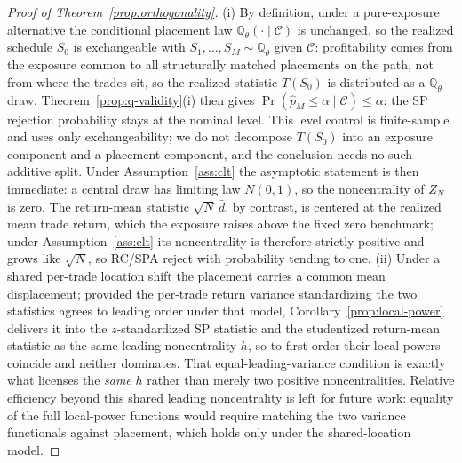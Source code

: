 \documentclass[risks,article,submit,pdftex,oneauthor]{Definitions/mdpi}
\begin{document}
\begin{proof}[Proof of Theorem~\ref{prop:orthogonality}]
(i) By definition, under a pure-exposure alternative the conditional placement law
$\mathbb{Q}_\theta(\cdot\mid\mathcal C)$ is unchanged, so the realized schedule
$S_0$ is exchangeable with $S_1,\dots,S_M\sim\mathbb{Q}_\theta$ given $\mathcal C$:
profitability comes from the exposure common to all structurally matched
placements on the path, not from where the trades sit, so the realized statistic
$T(S_0)$ is distributed as a $\mathbb{Q}_\theta$-draw.
Theorem~\ref{prop:q-validity}(i) then gives
$\Pr(\hat p_M\le\alpha\mid\mathcal C)\le\alpha$: the SP rejection probability stays
at the nominal level. This level control is finite-sample and uses only
exchangeability; we do not decompose $T(S_0)$ into an exposure component and a
placement component, and the conclusion needs no such additive split. Under
Assumption~\ref{ass:clt} the asymptotic statement is then immediate: a central draw
has limiting law $N(0,1)$, so the noncentrality of $Z_N$ is zero. The return-mean
statistic $\sqrt N\,\bar d$, by contrast, is centered at the realized mean trade
return, which the exposure raises above the fixed zero benchmark; under
Assumption~\ref{ass:clt} its noncentrality is therefore strictly positive and grows
like $\sqrt N$, so RC/SPA reject with probability tending to one. (ii) Under a
shared per-trade location shift the placement carries a common mean displacement;
provided the per-trade return variance standardizing the two statistics agrees to
leading order under that model, Corollary~\ref{prop:local-power} delivers it into
the $z$-standardized SP statistic and the studentized return-mean statistic as the
same leading noncentrality $h$, so to first order their local powers coincide and
neither dominates. That equal-leading-variance condition is exactly what licenses
the \emph{same} $h$ rather than merely two positive noncentralities. Relative
efficiency beyond this shared leading noncentrality is left for future work:
equality of the full local-power functions would require matching the two variance
functionals against placement, which holds only under the shared-location model.
\end{proof}
\end{document}
